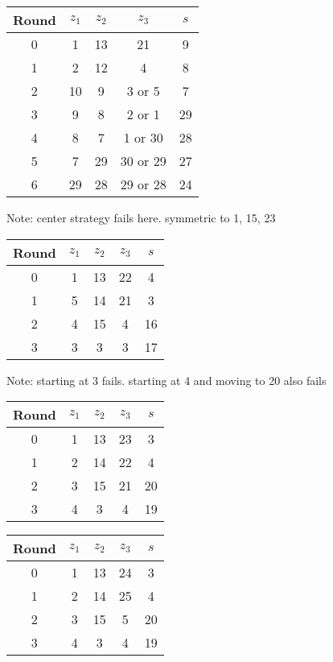 \begin{table}
\begin{tabular}{c | c | c | c | c }
Round & $z_1$ & $z_2$ & $z_3$ & $s$ \\
\hline
0 & 1 & 13 & 21 & 9 \\
1 & 2 & 12 & 4 & 8 \\
2 & 10 & 9 & 3 or 5 & 7 \\
3 & 9 & 8 & 2 or 1 & 29 \\
4 & 8 & 7 & 1 or 30 & 28 \\
5 & 7 & 29 & 30 or 29 & 27 \\
6 & 29 & 28 & 29 or 28 & 24
\end{tabular}
\end{table}
Note: center strategy fails here. symmetric to 1, 15, 23

\begin{table}
\begin{tabular}{c | c | c | c | c }
Round & $z_1$ & $z_2$ & $z_3$ & $s$ \\
\hline
0 & 1 & 13 & 22 & 4 \\
1 & 5 & 14 & 21 & 3 \\
2 & 4 & 15 & 4 & 16 \\
3 & 3 & 3 & 3 & 17
\end{tabular}
\end{table}
Note: starting at 3 fails. starting at 4 and moving to 20 also fails

\begin{table}
\begin{tabular}{c | c | c | c | c }
Round & $z_1$ & $z_2$ & $z_3$ & $s$ \\
\hline
0 & 1 & 13 & 23 & 3 \\
1 & 2 & 14 & 22 & 4 \\
2 & 3 & 15 & 21 & 20 \\
3 & 4 & 3 & 4 & 19
\end{tabular}
\end{table}

\begin{table}
\begin{tabular}{c | c | c | c | c }
Round & $z_1$ & $z_2$ & $z_3$ & $s$ \\
\hline
0 & 1 & 13 & 24 & 3 \\
1 & 2 & 14 & 25 & 4 \\
2 & 3 & 15 & 5 & 20 \\
3 & 4 & 3 & 4 & 19
\end{tabular}
\end{table}

